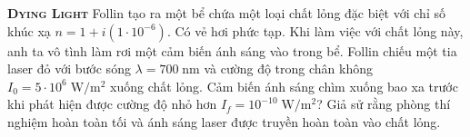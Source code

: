 \begin{problem}{\textbf{\textsc{Dying Light}}} Follin tạo ra một bể chứa một loại chất lỏng đặc biệt với chỉ số khúc xạ $n = 1 + i(1\cdot 10^{-6}).$ Có vẻ hơi phức tạp. Khi làm việc với chất lỏng này, anh ta vô tình làm rơi một cảm biến ánh sáng vào trong bể. Follin chiếu một tia laser đỏ với bước sóng $\lambda=700\;\text{nm}$ và cường độ trong chân không $I_0 = 5\cdot 10^{6}\;\mathrm{W/m^2}$ xuống chất lỏng. Cảm biến ánh sáng chìm xuống bao xa trước khi phát hiện được cường độ nhỏ hơn $I_f = 10^{-10}\;\mathrm{W/m^2}$? Giả sử rằng phòng thí nghiệm hoàn toàn tối và ánh sáng laser được truyền hoàn toàn vào chất lỏng.  

\end{problem}